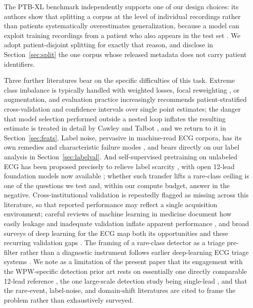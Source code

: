\documentclass[11pt]{article}
\begin{document}
The PTB-XL benchmark independently supports one of our design choices: its authors show that splitting a corpus at the level of individual recordings rather than patients systematically overestimates generalization, because a model can exploit training recordings from a patient who also appears in the test set \cite{strodthoff}. We adopt patient-disjoint splitting for exactly that reason, and disclose in Section~\ref{sec:split} the one corpus whose released metadata does not carry patient identifiers.

Three further literatures bear on the specific difficulties of this task. Extreme class imbalance is typically handled with weighted losses, focal reweighting \cite{focalloss}, or augmentation, and evaluation practice increasingly recommends patient-stratified cross-validation and confidence intervals over single point estimates; the danger that model selection performed outside a nested loop inflates the resulting estimate is treated in detail by Cawley and Talbot \cite{cawley}, and we return to it in Section~\ref{sec:feats}. Label noise, pervasive in machine-read ECG corpora, has its own remedies and characteristic failure modes \cite{karimi}, and bears directly on our label analysis in Section~\ref{sec:labelval}. And self-supervised pretraining on unlabeled ECG has been proposed precisely to relieve label scarcity \cite{mehari}, with open 12-lead foundation models now available \cite{ecgfm,hubert}; whether such transfer lifts a rare-class ceiling is one of the questions we test and, within our compute budget, answer in the negative. Cross-institutional validation is repeatedly flagged as missing across this literature, so that reported performance may reflect a single acquisition environment; careful reviews of machine learning in medicine document how easily leakage and inadequate validation inflate apparent performance \cite{roberts}, and broad surveys of deep learning for the ECG map both its opportunities and these recurring validation gaps \cite{hong}. The framing of a rare-class detector as a triage pre-filter rather than a diagnostic instrument follows earlier deep-learning ECG triage systems \cite{vandeleur}. We note as a limitation of the present paper that its engagement with the WPW-specific detection prior art rests on essentially one directly comparable 12-lead reference \cite{leadi}, the one large-scale detection study being single-lead \cite{huang}, and that the rare-event, label-noise, and domain-shift literatures are cited to frame the problem rather than exhaustively surveyed.
\end{document}
